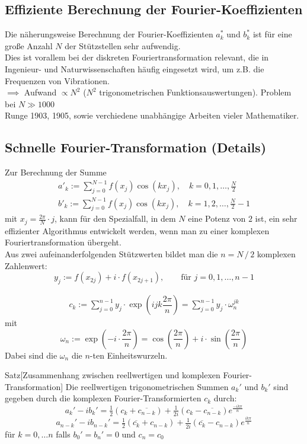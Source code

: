 \subsection{Effiziente Berechnung der Fourier-Koeffizienten}
Die näherungsweise Berechnung der Fourier-Koeffizienten $a_k^*$ und $b_k^*$ ist für eine große Anzahl $N$ der 
Stützstellen sehr aufwendig. \\
Dies ist vorallem bei der diskreten Fouriertransformation relevant, die in Ingenieur- und Naturwissenschaften 
häufig eingesetzt wird, um z.B. die Frequenzen von Vibrationen. \\
$\implies$ Aufwand $\propto N^2$ ($N^2$ trigonometrischen Funktionsauswertungen). Problem bei $N\gg 1000$ \\
Runge 1903, 1905, sowie verchiedene unabhängige Arbeiten vieler Mathematiker.
\subsection{Schnelle Fourier-Transformation (Details)}
Zur Berechnung der Summe
\begin{align*}
    a'_k := \sum_{j=0}^{N-1} f(x_j)\cos(kx_j), \quad k=0,1,\dotsc,\tfrac{N}{2} \\
    b'_k := \sum_{j=0}^{N-1} f(x_j)\cos(kx_j), \quad k=1,2,\dotsc,\tfrac{N}{2}-1 
\end{align*}
mit $x_j=\tfrac{2\pi}{N}\cdot j$, kann für den Spezialfall, in dem $N$ eine Potenz von $2$ ist, ein sehr effizienter 
Algorithmus entwickelt werden, wenn man zu einer komplexen Fouriertransformation übergeht. \\
Aus zwei aufeinanderfolgenden Stützwerten bildet man die $n=N\,/\,2$ komplexen Zahlenwert:
\[y_j := f(x_{2j}) + i\cdot f(x_{2j+1}),\qquad \text{für } j=0,1,\dotsc,n-1\]
\begin{defbox}
    \begin{align*}
        c_k := \sum_{j=0}^{n-1} y_j\cdot \exp\left(ijk\dfrac{2\pi}{n}\right) = \sum_{j=0}^{n-1} y_j\cdot \omega_n^{jk}
    \end{align*}
    mit 
    \[\omega_n := \exp\left(-i\cdot\dfrac{2\pi}{n}\right) = \cos\left(\dfrac{2\pi}{n}\right)+i\cdot\sin\left(\dfrac{2\pi}{n}\right)\]
    Dabei sind die $\omega_n$ die $n$-ten Einheitswurzeln.
\end{defbox}
\begin{thmbox}{Satz}[Zusammenhang zwischen reellwertigen und komplexen Fourier-Transformation]
    Die reellwertigen trigonometrischen Summen $a_k'$ und $b_k'$ sind gegeben durch die komplexen 
    Fourier-Transformierten $c_k$ durch:
    \[a_k'-ib_k'=\tfrac{1}{2}(c_k+\overline{c_{n-k}}) + \tfrac{1}{2i}(c_k-\overline{c_{n-k}})e^{\tfrac{-ik\pi}{n}}\]
    \[a_{n-k}'-ib_{n-k}'=\tfrac{1}{2}(\overline{c_k}+c_{n-k}) + \tfrac{1}{2i}(\overline{c_k}-c_{n-k})e^{\tfrac{ik\pi}{n}}\]
    für $k=0,\dots n$ falls $b_0'=b_n'=0$ und $c_n=c_0$
\end{thmbox}